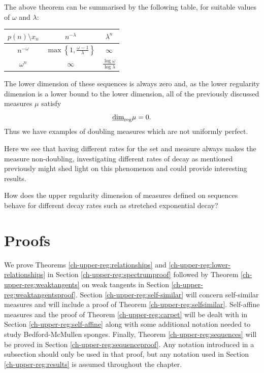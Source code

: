 The above theorem can be summarised by the following table, for suitable values of $\omega$ and $\lambda$:


\begin{table}[h]
	\centering
	\label{ch-upper-reg:sequencetable}
	\begin{tabular}{c|cc}
		$p(n) \setminus x_n$ & $n^{-\lambda}$             & $\lambda^n$                        \\ \hline
		$n^{-\omega}$       & $\max \left\{1,\frac{\omega - 1}{\lambda}\right\}$ & $\infty$\\
		$\omega^n$          & $\infty$                         & $\frac{\log \omega}{\log \lambda}$
	\end{tabular}
\end{table}

The lower dimension of these sequences is always zero and, as the lower regularity dimension is a lower bound to the lower dimension, all of the previously discussed measures $\mu$ satisfy 
\[
\underline{\dim}_{\textup{reg}} \mu = 0.
\]
Thus we have examples of doubling measures which are not uniformly perfect. 

Here we see that having different rates for the set and measure always makes the measure non-doubling, investigating different rates of decay as mentioned previously might shed light on this phenomenon and could provide interesting results.

\begin{question}
How does the upper regularity dimension of measures defined on sequences behave for different decay rates such as stretched exponential decay?
\end{question}



\section{Proofs} \label{ch-upper-reg:proof}

We prove Theorems \ref{ch-upper-reg:relationships} and \ref{ch-upper-reg:lower-relationships} in Section \ref{ch-upper-reg:spectrumproof} followed by Theorem \ref{ch-upper-reg:weaktangents} on weak tangents in Section \ref{ch-upper-reg:weaktangentsproof}. Section \ref{ch-upper-reg:self-similar} will concern self-similar measures and will include a proof of Theorem \ref{ch-upper-reg:selfsimilar}. Self-affine measures and the proof of Theorem \ref{ch-upper-reg:carpet} will be dealt with in Section \ref{ch-upper-reg:self-affine} along with some additional notation needed to study Bedford-McMullen sponges. Finally, Theorem \ref{ch-upper-reg:sequences} will be proved in Section \ref{ch-upper-reg:sequenceproof}. Any notation introduced in a subsection should only be used in that proof, but any notation used in Section \ref{ch-upper-reg:results} is assumed throughout the chapter.







